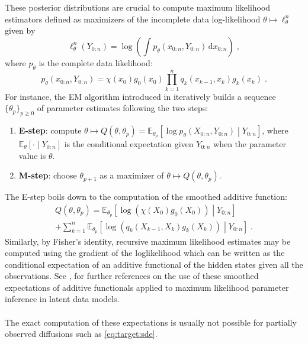 \documentclass[12pt]{article}
\newcommand{\rmd}{\mathrm{d}}
\newcommand{\eqsp}{\;}
\newcommand{\1}{\mathrm{1}}
\newcommand{\qk}{q_{k}}
\begin{document}
These posterior distributions are crucial to compute maximum likelihood estimators defined as maximizers of the incomplete data log-likelihood $\theta\mapsto \ell_{\theta}^{n}$ given by
\begin{equation*}
\ell_{\theta}^{n}(Y_{0:n}) = \log\left(\int p_{\theta}(x_{0:n},Y_{0:n})\,\rmd x_{0:n}\right)\eqsp,
\end{equation*}  
where $p_{\theta}$ is the complete data likelihood:
\begin{equation*}
p_{\theta}(x_{0:n},Y_{0:n}) = \chi(x_0)g_{0}(x_0)\prod^{n}_{k=1}\qk(x_{k-1},x_k)g_{k}(x_k)\eqsp.
\end{equation*}
For instance, the EM algorithm introduced in \cite{dempster:laird:rubin:1977} iteratively builds a sequence $\{\theta_{p}\}_{p\ge 0}$ of parameter estimates following the two steps:
\begin{enumerate}
	\item {\bf E-step}: compute $\theta \mapsto Q(\theta,\theta_{p}) = \mathbb{E}_{\theta_p}\left[\log p_{\theta}(X_{0:n},Y_{0:n})\middle|Y_{0:n}\right]$, where $\mathbb{E}_{\theta}\left[\cdot\middle|Y_{0:n}\right]$ is the conditional expectation given $Y_{0:n}$ when the parameter value is $\theta$.
	\item {\bf M-step}: choose $\theta_{p+1}$ as a maximizer of $\theta \mapsto Q(\theta,\theta_{p})$.
\end{enumerate}
The E-step boils down to the computation of the smoothed additive function: 
\begin{multline*}
Q(\theta,\theta_{p}) = \mathbb{E}_{\theta_p}\left[\log \left(\chi(X_0)g_{0}(X_0)\right)\middle|Y_{0:n}\right] \\
+ \sum_{k=1}^n\mathbb{E}_{\theta_p}\left[\log \left(\qk(X_{k-1},X_k)g_k(X_k)\right)\middle|Y_{0:n}\right] \eqsp.
\end{multline*}
Similarly, by Fisher's identity, recursive maximum likelihood estimates may be computed using the gradient of the loglikelihood which can be written as the conditional expectation of an additive functional of the hidden states given all the observations.
 See \cite[Chapter $10$ and $11$]{cappe:moulines:ryden:2005}, \cite{kantas:doucet:signh:2015,doucet:poyiadjis:singh:2011,lecorff:fort:2013a,lecorff:fort:2013b}
for further references on the use of these smoothed expectations of additive functionals  applied to maximum likelihood parameter inference in latent data models.\\
\\
The exact computation of these expectations is usually not possible for partially observed diffusions such as \eqref{eq:target:sde}. 
\end{document}
